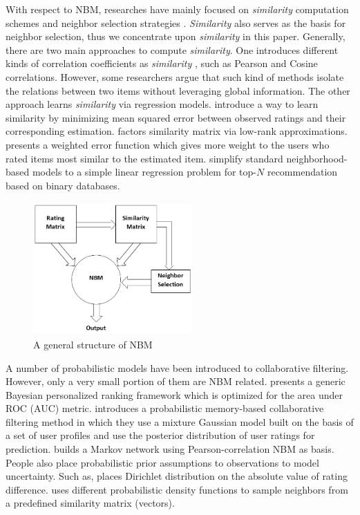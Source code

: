 \documentclass[conference]{IEEEtran}
\begin{document}
With respect to NBM, researches have mainly focused on \emph{similarity} computation schemes \cite{desrosiers2011comprehensive} and neighbor selection strategies \cite{adamopoulos2014over}.  \emph{Similarity} also serves as the basis for neighbor selection, thus we concentrate upon \emph{similarity} in this paper. Generally, there are two main approaches to compute \emph{similarity}. One introduces different kinds of correlation coefficients as \emph{similarity} \cite{desrosiers2011comprehensive}, such as Pearson and Cosine correlations. However, some researchers argue that such kind of methods isolate the relations between two items without leveraging global information. The other approach learns \emph{similarity} via regression models. \cite{bell2007scalable, toscher2008improved} introduce a way to learn similarity by minimizing mean squared error between observed ratings and their corresponding estimation. \cite{toscher2008improved} factors similarity matrix via low-rank approximations. \cite{bell2007modeling} presents a weighted  error function which gives more weight to the users who rated items most similar to the estimated item.  \cite{ning2011slim,rendle2009bpr} simplify standard neighborhood-based models to a simple linear regression problem for top-$N$ recommendation based on binary databases.

\begin{figure}[t]
\centering
\includegraphics[height=2.0in, width=2.4in]{nmb1}
\caption{ A general structure of NBM}
\label{strnbm}
\end{figure}

A number of probabilistic models have been introduced to collaborative filtering. However, only a very small portion of them are NBM related.
 \cite{rendle2009bpr} presents a generic Bayesian personalized ranking framework which is optimized for the area under ROC (AUC) metric. \cite{yu2004probabilistic} introduces a probabilistic memory-based collaborative filtering method in which they use a mixture Gaussian model built on the basis of a set of user profiles and use the posterior distribution of user ratings for prediction.  \cite{defazio2012graphical} builds a Markov network using Pearson-correlation NBM as basis. People also place probabilistic prior assumptions to observations to model uncertainty. Such as, \cite{guo2013novel} places Dirichlet distribution on the absolute value of rating difference. \cite{adamopoulos2014over} uses different probabilistic density functions to sample neighbors from a predefined similarity matrix (vectors).
\end{document}
